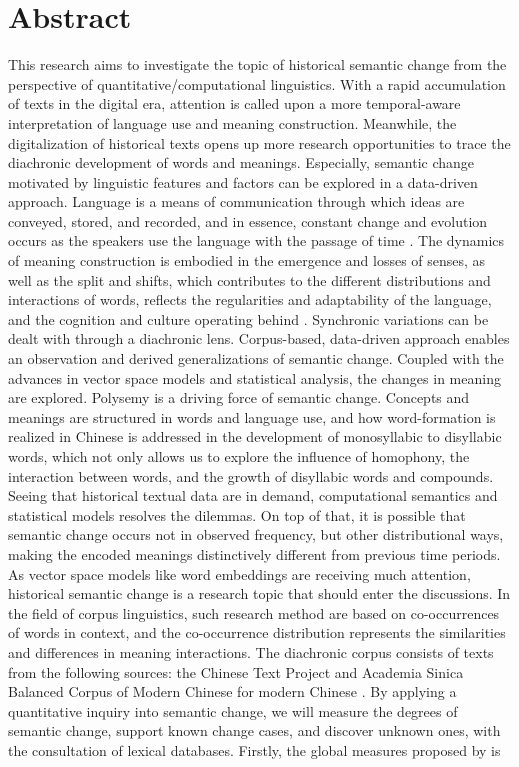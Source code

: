 
\chapter*{Abstract}
This research aims to investigate the topic of historical semantic change from the perspective of quantitative/computational linguistics. With a rapid accumulation of texts in the digital era, attention is called upon a more temporal-aware interpretation of language use and meaning construction. Meanwhile, the digitalization of historical texts opens up more research opportunities to trace the diachronic development of words and meanings. Especially, semantic change motivated by linguistic features and factors can be explored in a data-driven approach. Language is a means of communication through which ideas are conveyed, stored, and recorded, and in essence, constant change and evolution occurs as the speakers use the language with the passage of time \parencite[61]{blank1999new}. The dynamics of meaning construction is embodied in the emergence and losses of senses, as well as the split and shifts, which contributes to the different distributions and interactions of words, reflects the regularities and adaptability of the language, and the cognition and culture operating behind \parencite[63]{blank1999new}. Synchronic variations can be dealt with through a diachronic lens. Corpus-based, data-driven approach enables an observation and derived generalizations of semantic change. Coupled with the advances in vector space models and statistical analysis, the changes in meaning are explored. Polysemy is a driving force of semantic change. Concepts and meanings are structured in words and language use, and how word-formation is realized in Chinese is addressed in the development of monosyllabic to disyllabic words, which not only allows us to explore the influence of homophony, the interaction between words, and the growth of disyllabic words and compounds. Seeing that historical textual data are in demand, computational semantics and statistical models resolves the dilemmas. On top of that, it is possible that semantic change occurs not in observed frequency, but other distributional ways, making the encoded meanings distinctively different from previous time periods. As vector space models like word embeddings are receiving much attention, historical semantic change is a research topic that should enter the discussions. In the field of corpus linguistics, such research method are based on co-occurrences of words in context, and the co-occurrence distribution represents the similarities and differences in meaning interactions. The diachronic corpus consists of texts from the following sources: the Chinese Text Project \parencite{sturgeon2019ctext} and Academia Sinica Balanced Corpus of Modern Chinese for modern Chinese \parencite{chen1996sinica}. By applying a quantitative inquiry into semantic change, we will measure the degrees of semantic change, support known change cases, and discover unknown ones, with the consultation of lexical databases. Firstly, the global measures proposed by \textcite{hamilton2016cultural} is 